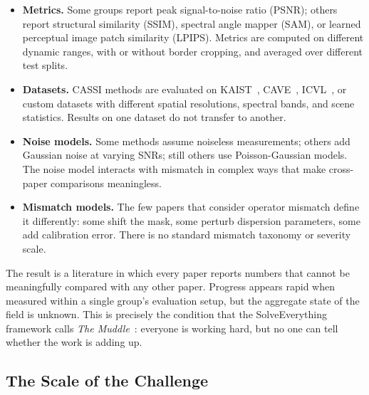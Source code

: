 \begin{itemize}
  \item \textbf{Metrics.}
        Some groups report peak signal-to-noise ratio (PSNR); others
        report structural similarity (SSIM), spectral angle mapper
        (SAM), or learned perceptual image patch similarity (LPIPS).
        Metrics are computed on different dynamic ranges, with or
        without border cropping, and averaged over different test splits.

  \item \textbf{Datasets.}
        CASSI methods are evaluated on KAIST~\cite{choi2017kaist},
        CAVE~\cite{yasuma2010cave}, ICVL~\cite{arad2016icvl}, or
        custom datasets with different spatial resolutions, spectral
        bands, and scene statistics.
        Results on one dataset do not transfer to another.

  \item \textbf{Noise models.}
        Some methods assume noiseless measurements; others add Gaussian
        noise at varying SNRs; still others use Poisson-Gaussian models.
        The noise model interacts with mismatch in complex ways that
        make cross-paper comparisons meaningless.

  \item \textbf{Mismatch models.}
        The few papers that consider operator mismatch define it
        differently: some shift the mask, some perturb dispersion
        parameters, some add calibration error.
        There is no standard mismatch taxonomy or severity scale.
\end{itemize}

The result is a literature in which every paper reports numbers that
cannot be meaningfully compared with any other paper.
Progress appears rapid when measured within a single group's evaluation
setup, but the aggregate state of the field is unknown.
This is precisely the condition that the SolveEverything framework
calls \emph{The Muddle}~\cite{wissner2026solveeverything}: everyone is working
hard, but no one can tell whether the work is adding up.


\subsection{The Scale of the Challenge}
\label{sec:scale}

